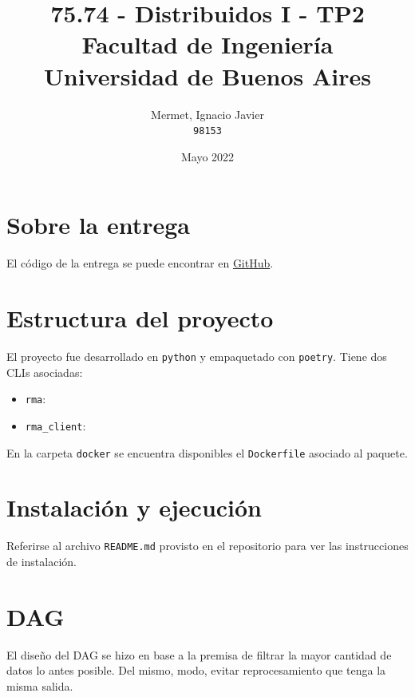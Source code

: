 \documentclass[titlepage,a4paper,oneside]{article}
\begin{document}
\begin{titlepage}
\title{
	75.74 \-- Distribuidos I \-- TP2\\
    \large Facultad de Ingeniería\\
	Universidad de Buenos Aires
}
\author{
	Mermet, Ignacio Javier\\
	\texttt{98153}
}
\date{Mayo 2022}

\maketitle

\end{titlepage}

\tableofcontents

\newpage

\section{Sobre la entrega}
El código de la entrega se puede encontrar en \href{https://github.com/CrossNox/7574-TP2}{GitHub}.

\section{Estructura del proyecto}
El proyecto fue desarrollado en \texttt{python}\cite{Python} y empaquetado con \texttt{poetry}\cite{PythonPoetry}. Tiene dos CLIs asociadas:

\begin{itemize}
	\item \texttt{rma}:
	\item \texttt{rma\_client}:
\end{itemize}

En la carpeta \texttt{docker} se encuentra disponibles el \texttt{Dockerfile} asociado al paquete.

\section{Instalación y ejecución}
Referirse al archivo \texttt{README.md} provisto en el repositorio para ver las instrucciones de instalación.

\section{DAG}
El diseño del DAG se hizo en base a la premisa de filtrar la mayor cantidad de datos lo antes posible. Del mismo, modo, evitar reprocesamiento que tenga la misma salida.
\end{document}
